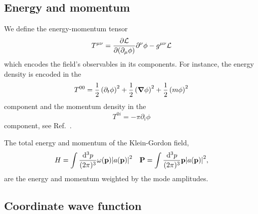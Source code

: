 \subsection{Energy and momentum}

\begin{definition}
	We define the energy-momentum tensor
	\begin{equation}
		T^{\mu\nu}
		=
		\pdv{\mathcal{L}}{(\partial_\mu\phi)}\partial^\nu\phi
		-
		g^{\mu\nu}\mathcal{L}
		\label{eq:energy_momentum_tensor}
	\end{equation}
	which encodes the field's observables in its components.
	For instance, the energy density is encoded in the
	\begin{equation*}
		T^{00}
		=
		\frac{1}{2}
		\left(\partial_t\phi\right)^2
		+
		\frac{1}{2}
		\left(\grad\phi\right)^2
		+
		\frac{1}{2}
		\left(m\phi\right)^2		
	\end{equation*}
	component and the momentum density in the
	\begin{equation*}
		T^{0i}
		=
		-\pi\partial_i\phi		
	\end{equation*}
	component, see Ref.~\cite{Peskin1995}.
\end{definition}
\begin{lemma}\label{thm:kg_total_energy_momentum}
	The total energy and momentum of the Klein-Gordon field,
	\begin{align}
		H
		=
		\int\frac{\dd[3]{p}}{(2\pi)^3}
		\omega(\vb{p})\abs{a(\vb{p})}^2
		&&
		\vb{P}
		=
		\int\frac{\dd[3]{p}}{(2\pi)^3}
		\vb{p}\abs{a(\vb{p})}^2
		\label{eq:kg_energy_momentum}
		,
	\end{align}
	are the energy and momentum weighted by the mode amplitudes.
\end{lemma}

\subsection{Coordinate wave function}

